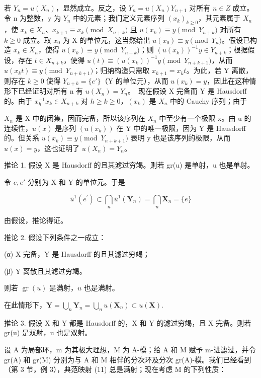 	若 \(Y_{n}=u(X_{n})\)，显然成立。反之，设 \(Y_{n}=u(X_{n})Y_{n+1}\) 对所有 \(n\in Z\) 成立。令 n 为整数，y 为 \(Y_{n}\) 中的元素；我们定义元素序列 \((x_{k})_{k\geq0}\)，其元素属于 \(X_{n}\)，使 \(x_{k}\in X_{n}\)、\(x_{k+1}\equiv x_{k} \pmod{X_{n+k}}\) 且 \(u(x_{k})\equiv y \pmod{Y_{n+k}}\) 对所有 \(k\geq0\) 成立。取 \(x_{0}\) 为 X 的单位元，这当然给出 \(u(x_{0})\equiv y \pmod{Y_{n}}\)。假设已构造 \(x_{k}\in X_{n}\)，使得 \(u(x_{k})\equiv y \pmod{Y_{n+k}}\)；则 \((u(x_{k}))^{-1}y\in Y_{n+k}\)；根据假设，存在 \(t\in X_{n+k}\)，使得 \(u(t)\equiv(u(x_{k}))^{-1}y \pmod{Y_{n+k+1}}\)，从而 \(u(x_{k}t)\equiv y \pmod{Y_{n+k+1}}\)；归纳构造只需取 \(x_{k+1}=x_{k}t\)。为此，若 Y 离散，则存在 \(k\geq0\) 使得 \(Y_{n+k}=\{e'\}\)（Y 的单位元），从而 \(u(x_{k})=y\)，因此在这种情形下已经证明对所有 n 有 \(u(X_{n})=Y_{n}\)。~现在假设 X 完备而 Y 是 Hausdorff 的。由于 \(x_{h}^{-1}x_{k}\in X_{n+k}\) 对 \(h\geq k\geq0\)，\((x_{k})\) 是 \(X_{n}\) 中的 Cauchy 序列；由于

\(X_{n}\) 是 X 中的闭集，因而完备，所以该序列在 \(X_{n}\) 中至少有一个极限 x。由 u 的连续性，\(u(x)\) 是序列 \((u(x_{k}))\) 在 Y 中的唯一极限，因为 Y 是 Hausdorff 的。但关系 \(u(x_{k}) \equiv y \pmod{Y_{n+k+1}}\) 表明 y 也是该序列的极限，从而 \(u(x) = y\)，这也证明了 \(u(X_{n}) = Y_{n}\)。

推论 1. 假设 X 是 Hausdorff 的且其滤过穷竭。则若 gr(u) 是单射，u 也是单射。

令 \(e, e'\) 分别为 X 和 Y 的单位元。于是

\[
\bar {u} ^ {1} (e ^ {\prime}) \subset \bigcap_ {n} \bar {u} ^ {1} (\mathbf {Y} _ {n}) = \bigcap_ {n} \mathbf {X} _ {n} = \{e \}
\]

由假设，推论得证。

推论 2. 假设下列条件之一成立：

(α) X 完备，Y 是 Hausdorff 的且其滤过穷竭；

(β) Y 离散且其滤过穷竭。

则若 \(\operatorname{gr}(u)\) 是满射，\(u\) 也是满射。

	在此情形下，\(\mathbf{Y} = \bigcup_{n}\mathbf{Y}_{n} = \bigcup_{n}u(\mathbf{X}_{n})\subset u(\mathbf{X}).\)

推论 3. 假设 X 和 Y 都是 Hausdorff 的，X 和 Y 的滤过穷竭，且 X 完备。则若 gr(u) 是双射，u 也是双射。

设 A 为局部环，m 为其极大理想，M 为 A-模；给 A 和 M 赋予 m-进滤过，并令 gr(A) 和 gr(M) 分别为与 A 和 M 相伴的分次环及分次 gr(A)-模。我们已经看到（第 3 节，例 3），典范映射 (11) 总是满射；现在考虑 M 的下列性质：

